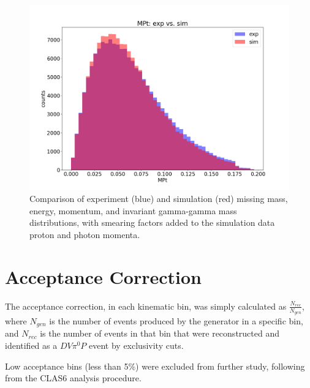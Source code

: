 \begin{figure}[hbt]
	\includegraphics[page=135,width=0.3\linewidth]{Chapters/Ch3-Simulations/pics/yessmear/outbending_rad_All_All_All_for_aps_2022_plots_sangcutsMPt_exp_vs_sim.png}
	
	\caption{Comparison of experiment (blue) and simulation (red) missing mass, energy, momentum, and invariant gamma-gamma mass distributions, with smearing factors added to the simulation data proton and photon momenta.}
	\label{fig:good}
\end{figure}


\section{Acceptance Correction}

The acceptance correction, in each kinematic bin, was simply calculated as $\frac{N_{rec}}{N_{gen}}$, where $N_{gen}$ is the number of events produced by the generator in a specific bin, and $N_{rec}$ is the number of events in that bin that were reconstructed and identified as a $DV\pi^0P$ event by exclusivity cuts. 

Low acceptance bins (less than 5\%) were excluded from further study, following from the CLAS6 analysis procedure. 